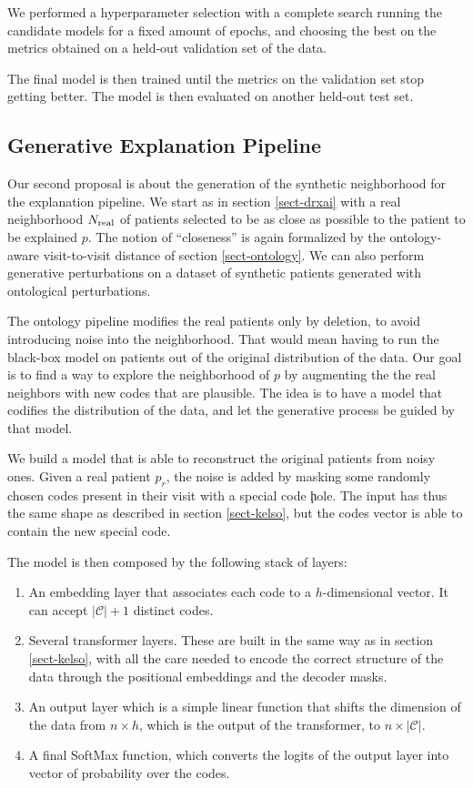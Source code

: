 \documentclass[]{marticle}
\newcommand{\codes}{\mathcal{C}}
\begin{document}
We performed a hyperparameter selection with a complete search running the candidate models for a
fixed amount of epochs, and choosing the best on the metrics obtained on a held-out validation set
of the data.

The final model is then trained until the metrics on the validation set stop getting better. The
model is then evaluated on another held-out test set.

\subsection{Generative Explanation Pipeline}

Our second proposal is about the generation of the synthetic neighborhood for the explanation
pipeline. We start as in section \ref{sect-drxai} with a real neighborhood $N_\text{real}$ of patients
selected to be as close as possible to the patient to be explained $p$. The notion of ``closeness''
is again formalized by the ontology-aware visit-to-visit distance of section \ref{sect-ontology}.
We can also perform generative perturbations on a dataset of synthetic patients generated with
ontological perturbations.

The ontology pipeline modifies the real patients only by deletion, to avoid introducing noise into
the neighborhood. That would mean having to run the black-box model on patients out of the original
distribution of the data. Our goal is to find a way to explore the neighborhood of $p$ by augmenting
the the real neighbors with new codes that are plausible. The idea is to have a model that codifies
the distribution of the data, and let the generative process be guided by that model.


We build a model that is able to reconstruct the original patients from noisy ones. Given a real
patient $p_r$, the noise is added by masking some randomly chosen codes present in their visit with
a special code \c{hole}. The input has thus the same shape as described in section \ref{sect-kelso},
but the codes vector is able to contain the new special code.

The model is then composed by the following stack of layers:
\begin{enumerate}
\item An embedding layer that associates each code to a $h$-dimensional vector. It can accept
$|\codes|+1$ distinct codes.

\item Several transformer layers. These are built in the same way as in section \ref{sect-kelso},
with all the care needed to encode the correct structure of the data through the positional
embeddings and the decoder masks.

\item An output layer which is a simple linear function that shifts the dimension of the data from
$n \times h$, which is the output of the transformer, to $n \times |\codes|$.

\item A final SoftMax function, which converts the logits of the output layer into vector of
probability over the codes.
\end{enumerate}
\end{document}
